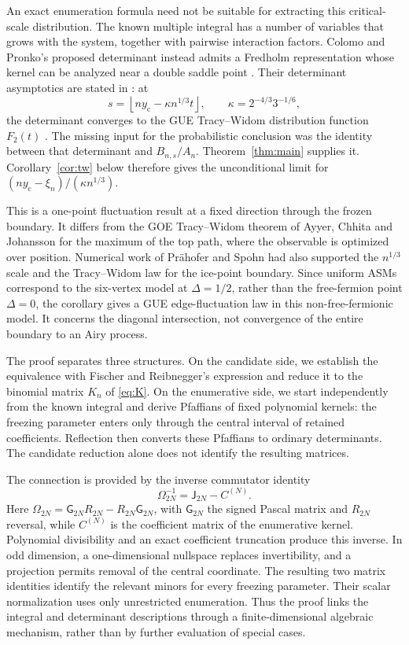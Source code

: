 \documentclass[11pt,a4paper]{amsart}
\theoremstyle{remark}\newtheorem{remark}[theorem]{Remark}
\numberwithin{equation}{section}
\newcommand{\G}{\mathsf G}
\newcommand{\J}{\mathsf J}
\begin{document}
An exact enumeration formula need not be suitable for extracting this critical-scale distribution. The known multiple integral has a number of variables that grows with the system, together with pairwise interaction factors. Colomo and Pronko's proposed determinant instead admits a Fredholm representation whose kernel can be analyzed near a double saddle point \cite[Sections~4.2--4.4]{CP24}. Their determinant asymptotics are stated in \cite[Theorem~4]{CP}: at
\[
 s=\left\lfloor ny_{\mathrm c}-\kappa n^{1/3}t\right\rfloor,
 \qquad \kappa=2^{-4/3}3^{-1/6},
\]
the determinant converges to the GUE Tracy--Widom distribution function $F_2(t)$ \cite{TW}. The missing input for the probabilistic conclusion was the identity between that determinant and $B_{n,s}/A_n$. Theorem~\ref{thm:main} supplies it. Corollary~\ref{cor:tw} below therefore gives the unconditional limit for $(ny_{\mathrm c}-\xi_n)/(\kappa n^{1/3})$.

This is a one-point fluctuation result at a fixed direction through the frozen boundary. It differs from the GOE Tracy--Widom theorem of Ayyer, Chhita and Johansson \cite{ACJ} for the maximum of the top path, where the observable is optimized over position. Numerical work of Pr\"ahofer and Spohn \cite{PS} had also supported the $n^{1/3}$ scale and the Tracy--Widom law for the ice-point boundary. Since uniform ASMs correspond to the six-vertex model at $\Delta=1/2$, rather than the free-fermion point $\Delta=0$, the corollary gives a GUE edge-fluctuation law in this non-free-fermionic model. It concerns the diagonal intersection, not convergence of the entire boundary to an Airy process.

The proof separates three structures. On the candidate side, we establish the equivalence with Fischer and Reibnegger's expression \cite[Conjecture~6]{FR} and reduce it to the binomial matrix $K_n$ of \eqref{eq:K}. On the enumerative side, we start independently from the known integral and derive Pfaffians of fixed polynomial kernels: the freezing parameter enters only through the central interval of retained coefficients. Reflection then converts these Pfaffians to ordinary determinants. The candidate reduction alone does not identify the resulting matrices.

The connection is provided by the inverse commutator identity
\[
 \Omega_{2N}^{-1}=\J_{2N}-C^{(N)}.
\]
Here $\Omega_{2N}=\G_{2N}R_{2N}-R_{2N}\G_{2N}$, with $\G_{2N}$ the signed Pascal matrix and $R_{2N}$ reversal, while $C^{(N)}$ is the coefficient matrix of the enumerative kernel. Polynomial divisibility and an exact coefficient truncation produce this inverse. In odd dimension, a one-dimensional nullspace replaces invertibility, and a projection permits removal of the central coordinate. The resulting two matrix identities identify the relevant minors for every freezing parameter. Their scalar normalization uses only unrestricted enumeration. Thus the proof links the integral and determinant descriptions through a finite-dimensional algebraic mechanism, rather than by further evaluation of special cases.
\end{document}
